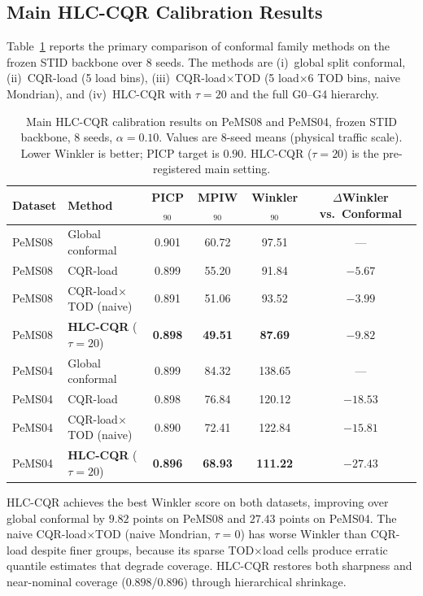 \documentclass[letterpaper,journal]{IEEEtran}
\begin{document}
\subsection{Main HLC-CQR Calibration Results}
\label{sec:hlc_main}

Table~\ref{tab:hlc_main} reports the primary comparison of conformal family
methods on the frozen STID backbone over 8 seeds.  The methods are
(i)~global split conformal, (ii)~CQR-load (5 load bins),
(iii)~CQR-load$\times$TOD (5 load$\times$6 TOD bins, naive Mondrian),
and (iv)~HLC-CQR with $\tau=20$ and the full G0--G4 hierarchy.

\begin{table}[t]
\centering
\caption{Main HLC-CQR calibration results on PeMS08 and PeMS04, frozen STID
backbone, 8 seeds, $\alpha=0.10$.  Values are 8-seed means (physical traffic
scale).  Lower Winkler is better; PICP target is $0.90$.  HLC-CQR
($\tau=20$) is the pre-registered main setting.}
\label{tab:hlc_main}
\footnotesize
\setlength{\tabcolsep}{4pt}
\begin{tabular}{@{}llcccc@{}}
\toprule
Dataset & Method & PICP$_{90}$ & MPIW$_{90}$ & Winkler$_{90}$ & $\Delta$Winkler vs.\ Conformal \\
\midrule
PeMS08 & Global conformal                & 0.901 & 60.72 & 97.51 & ---             \\
PeMS08 & CQR-load                        & 0.899 & 55.20 & 91.84 & $-5.67$         \\
PeMS08 & CQR-load$\times$TOD (naive)     & 0.891 & 51.06 & 93.52 & $-3.99$         \\
PeMS08 & \textbf{HLC-CQR} ($\tau{=}20$) & \textbf{0.898} & \textbf{49.51} & \textbf{87.69} & $\mathbf{-9.82}$ \\
\midrule
PeMS04 & Global conformal                & 0.899 & 84.32 & 138.65 & ---             \\
PeMS04 & CQR-load                        & 0.898 & 76.84 & 120.12 & $-18.53$        \\
PeMS04 & CQR-load$\times$TOD (naive)     & 0.890 & 72.41 & 122.84 & $-15.81$        \\
PeMS04 & \textbf{HLC-CQR} ($\tau{=}20$) & \textbf{0.896} & \textbf{68.93} & \textbf{111.22} & $\mathbf{-27.43}$ \\
\bottomrule
\end{tabular}
\end{table}

HLC-CQR achieves the best Winkler score on both datasets, improving over
global conformal by $9.82$ points on PeMS08 and $27.43$ points on PeMS04.
The naive CQR-load$\times$TOD (naive Mondrian, $\tau=0$) has worse Winkler
than CQR-load despite finer groups, because its sparse TOD$\times$load cells
produce erratic quantile estimates that degrade coverage.  HLC-CQR restores
both sharpness and near-nominal coverage ($0.898$/$0.896$) through
hierarchical shrinkage.
\end{document}
